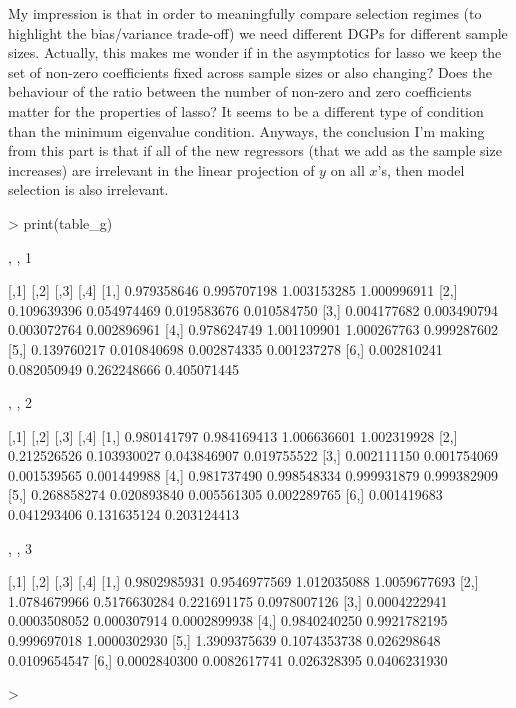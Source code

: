 \documentclass[a4paper,12pt,twoside]{article}
\begin{document}
My impression is that in order to meaningfully compare selection regimes 
(to highlight the bias/variance trade-off) we need different DGPs for different 
sample sizes. Actually, this makes me wonder if in the asymptotics for lasso
we keep the set of non-zero coefficients fixed across sample sizes or also
changing? Does the behaviour of the ratio between the number of non-zero and zero
coefficients matter for the properties of lasso? It seems to be a different 
type of condition than the minimum eigenvalue condition. Anyways, the conclusion
I'm making from this part is that if all of the new regressors (that we add
as the sample size increases) are irrelevant in the linear projection of $y$
on all $x$'s, then model selection is also irrelevant.
\begin{Schunk}
\begin{Sinput}
> print(table_g)
\end{Sinput}
\begin{Soutput}
, , 1

            [,1]        [,2]        [,3]        [,4]
[1,] 0.979358646 0.995707198 1.003153285 1.000996911
[2,] 0.109639396 0.054974469 0.019583676 0.010584750
[3,] 0.004177682 0.003490794 0.003072764 0.002896961
[4,] 0.978624749 1.001109901 1.000267763 0.999287602
[5,] 0.139760217 0.010840698 0.002874335 0.001237278
[6,] 0.002810241 0.082050949 0.262248666 0.405071445

, , 2

            [,1]        [,2]        [,3]        [,4]
[1,] 0.980141797 0.984169413 1.006636601 1.002319928
[2,] 0.212526526 0.103930027 0.043846907 0.019755522
[3,] 0.002111150 0.001754069 0.001539565 0.001449988
[4,] 0.981737490 0.998548334 0.999931879 0.999382909
[5,] 0.268858274 0.020893840 0.005561305 0.002289765
[6,] 0.001419683 0.041293406 0.131635124 0.203124413

, , 3

             [,1]         [,2]        [,3]         [,4]
[1,] 0.9802985931 0.9546977569 1.012035088 1.0059677693
[2,] 1.0784679966 0.5176630284 0.221691175 0.0978007126
[3,] 0.0004222941 0.0003508052 0.000307914 0.0002899938
[4,] 0.9840240250 0.9921782195 0.999697018 1.0000302930
[5,] 1.3909375639 0.1074353738 0.026298648 0.0109654547
[6,] 0.0002840300 0.0082617741 0.026328395 0.0406231930
\end{Soutput}
\begin{Sinput}
> 
\end{Sinput}
\end{Schunk}
\end{document}
